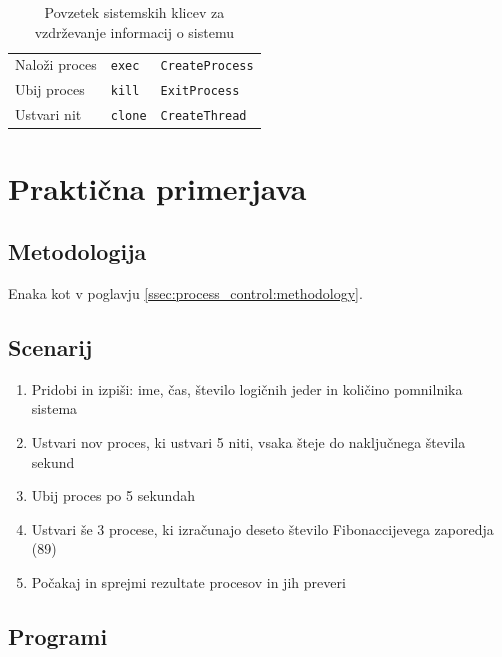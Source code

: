 \documentclass[a4paper,12pt,openright]{book}
\begin{document}
\begin{table}[h!]
\begin{center}
\begin{tabular}{ p{3cm}|p{2.9cm}|p{6.3cm} }
			Naloži proces                    & \verb|exec|                                     & \verb|CreateProcess|                                                                                               \\
			Ubij proces                       & \verb|kill|                                     & \verb|ExitProcess|                                                                                                 \\
			Ustvari nit                       & \verb|clone|                                    & \verb|CreateThread|                                                                                                \\
		\end{tabular}
	\end{center}
	\label{tab:information_maintenance}
	\caption{Povzetek sistemskih klicev za vzdrževanje informacij o sistemu}
\end{table} 

\section{Praktična primerjava}

\subsection{Metodologija}

Enaka kot v poglavju \ref{ssec:process_control:methodology}.

\subsection{Scenarij}

\begin{enumerate}
	\item Pridobi in izpiši: ime, čas, število logičnih jeder in količino pomnilnika sistema
	\item Ustvari nov proces, ki ustvari 5 niti, vsaka šteje do naključnega števila sekund
	\item Ubij proces po 5 sekundah
	\item Ustvari še 3 procese, ki izračunajo deseto število Fibonaccijevega zaporedja (89)
	\item Počakaj in sprejmi rezultate procesov in jih preveri
\end{enumerate}

\subsection{Programi}
\end{document}
